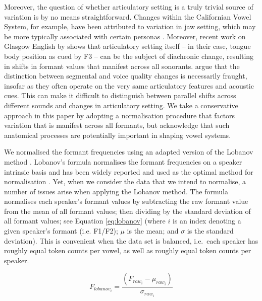 \documentclass[review]{elsarticle} %
\begin{document}
Moreover, the question of whether articulatory setting is a truly trivial source of variation is by no means straightforward.  Changes within the Californian Vowel System, for example, have been attributed to variation in jaw setting, which may be more typically associated with certain personas \citep{pratt2017jaw}.
Moreover, recent work on Glasgow English by \citet{soskuthyandstuartsmith20} shows that articulatory setting itself -- in their case, tongue body position as cued by F3 -- can be the subject of diachronic change, resulting in shifts in formant values that manifest across all sonorants. \citet{soskuthyandstuartsmith20} argue that the distinction between segmental and voice quality changes is necessarily fraught, insofar as they often operate on the very same articulatory features and acoustic cues. This can make it difficult to distinguish between parallel shifts across different sounds and changes in articulatory setting. We take a conservative approach in this paper by adopting a normalisation procedure that factors variation that is manifest across all formants, but acknowledge that such anatomical processes are potentially important in shaping vowel systems.

We normalised the formant frequencies using an adapted version of the Lobanov method \citep{lobanov1971classification}. Lobanov's formula normalises the formant frequencies on a speaker intrinsic basis and has been widely reported and used as the optimal method for normalisation \citep{adank2004comparison}. Yet, when we consider the data that we intend to normalise, a number of issues arise when applying the Lobanov method. The formula normalises each speaker's formant values by subtracting the raw formant value from the mean of all formant values; then dividing by the standard deviation of all formant values; see Equation \ref{eq:lobanov} (where $i$ is an index denoting a given speaker's formant (i.e. F1/F2); $\mu$ is the mean; and $\sigma$ is the standard deviation). This is convenient when the data set is balanced, i.e.\ each speaker has roughly equal token counts per vowel, as well as roughly equal token counts per speaker.

\begin{equation}
F_{lobanov_i} = \frac{(F_{raw_i}-\mu_{raw_i})}{\sigma_{raw_i}}
\label{eq:lobanov}
\end{equation}
\end{document}
